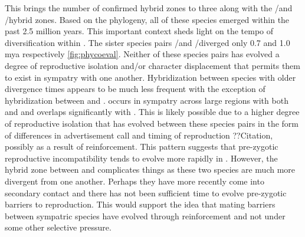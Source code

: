 This brings the number of confirmed \anaxyrus hybrid zones to three along with 
the \amer/\terr and \amer/\hemiophrys hybrid zones. 
Based on the \phycoeval phylogeny, all of these species emerged within the past 
2.5 million years.
This important context sheds light on the tempo of diversification within \anaxyrus.
The sister species pairs \fowl/\wood and \amer/\terr diverged only 0.7 and 1.0 mya
respectively \cref{fig:phycoeval}.
Neither of these species pairs has evolved a degree of reproductive isolation 
and/or character displacement that permits them to exist in sympatry with one 
another. 
Hybridization between species with older divergence times appears to be much 
less frequent with the exception of hybridization between \amer and \hemiophrys. 
\fowl occurs in sympatry across large regions with both \amer and \terr and 
\wood overlaps significantly with \amer \parencite{conant1998}.
This is likely possible due to a higher degree of reproductive isolation that 
has evolved between these species pairs in the form of differences in 
advertisement call and timing of reproduction ??Citation, possibly as a result 
of reinforcement.
This pattern suggests that pre-zygotic reproductive incompatibility tends to 
evolve more rapidly in \anaxyrus.
However, the hybrid zone between \amer and \hemiophrys complicates things 
as these two species are much more divergent from one another. 
Perhaps they have more recently come into secondary contact and there has not
been sufficient time to evolve pre-zygotic barriers to reproduction. 
This would support the idea that mating barriers between sympatric species 
have evolved through reinforcement and not under some other selective pressure. 


